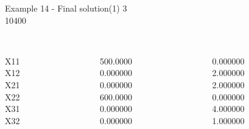 \begin{frame}{Example 14 - Final solution(1)}
\footnotesize
{}  3\\
  10400\\


\begin{columns}[t]
\begin{column}{0.3\textwidth}

\\
X11\\
X12\\
X21\\
X22\\
X31\\
X32\\
\end{column}
\begin{column}{0.3\textwidth}

\\
500.0000\\
0.000000\\
0.000000\\
600.0000\\
0.000000\\
0.000000\\

\end{column}  

\begin{column}{0.3\textwidth}

\\
0.000000\\
2.000000\\
2.000000\\
0.000000\\
4.000000\\
1.000000\\

\end{column}
\end{columns}
\end{frame}


